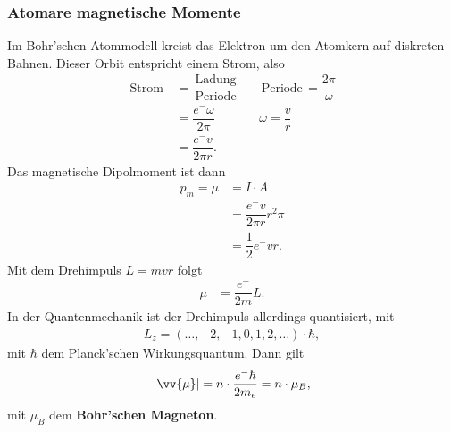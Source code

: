 \documentclass[a4paper,12pt]{article}
\begin{document}
\subsubsection{Atomare magnetische Momente}
Im Bohr'schen Atommodell kreist das Elektron um den Atomkern auf diskreten Bahnen. Dieser Orbit entspricht einem Strom, also
\begin{align*} 
        \,\text{Strom}\,&=\dfrac{\,\text{Ladung}\,}{\,\text{Periode}\,}&&\,\text{Periode}\,=\dfrac{2\pi }{\omega }\\
                        &=\dfrac{e^-\omega }{2\pi }&&\omega =\dfrac{v}{r}\\
                        &=\dfrac{e^-v}{2\pi r}
.\end{align*} 
Das magnetische Dipolmoment ist dann
\begin{align*} 
        p_m=\mu &=I\cdot A\\
                &=\dfrac{e^-v}{2\pi r}r^2\pi \\
                &=\dfrac{1}{2}e^-vr
.\end{align*} 
Mit dem Drehimpuls $L=mvr$ folgt
\begin{align*} 
        \mu &=\dfrac{e^-}{2m}L
.\end{align*} 
In der Quantenmechanik ist der Drehimpuls allerdings quantisiert, mit
\begin{align*} 
        L_z=\left(\hdots ,-2,-1,0,1,2,\hdots \right)\cdot \hbar
,\end{align*} 
mit $\hbar$ dem Planck'schen Wirkungsquantum. Dann gilt 
\begin{align*} 
        |\vv{\mu }|=n\cdot \dfrac{e^-\hbar}{2m_e}=n\cdot \mu _B
,\end{align*} 
mit $\mu _B$ dem \textbf{Bohr'schen Magneton}.
\end{document}
